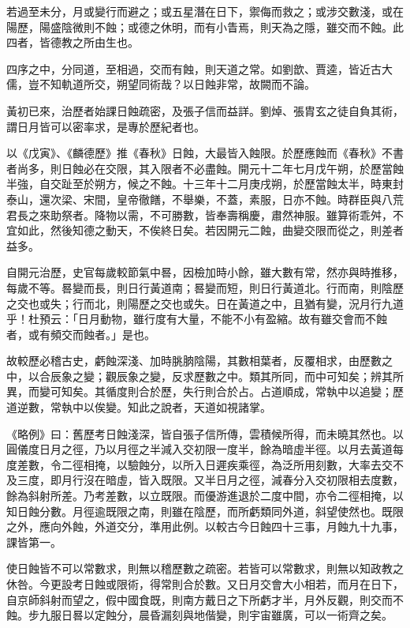 \begin{pinyinscope}
 若過至未分，月或變行而避之；或五星潛在日下，禦侮而救之；或涉交數淺，或在陽歷，陽盛陰微則不蝕；或德之休明，而有小眚焉，則天為之隱，雖交而不蝕。此四者，皆德教之所由生也。



 四序之中，分同道，至相過，交而有蝕，則天道之常。如劉歆、賈逵，皆近古大儒，豈不知軌道所交，朔望同術哉？以日蝕非常，故闕而不論。



 黃初已來，治歷者始課日蝕疏密，及張子信而益詳。劉焯、張胄玄之徒自負其術，謂日月皆可以密率求，是專於歷紀者也。



 以《戊寅》、《麟德歷》推《春秋》日蝕，大最皆入蝕限。於歷應蝕而《春秋》不書者尚多，則日蝕必在交限，其入限者不必盡蝕。開元十二年七月戊午朔，於歷當蝕半強，自交趾至於朔方，候之不蝕。十三年十二月庚戌朔，於歷當蝕太半，時東封泰山，還次梁、宋間，皇帝徹饍，不舉樂，不蓋，素服，日亦不蝕。時群臣與八荒君長之來助祭者。降物以需，不可勝數，皆奉壽稱慶，肅然神服。雖算術乖舛，不宜如此，然後知德之動天，不俟終日矣。若因開元二蝕，曲變交限而從之，則差者益多。



 自開元治歷，史官每歲較節氣中晷，因檢加時小餘，雖大數有常，然亦與時推移，每歲不等。晷變而長，則日行黃道南；晷變而短，則日行黃道北。行而南，則陰歷之交也或失；行而北，則陽歷之交也或失。日在黃道之中，且猶有變，況月行九道乎！杜預云：「日月動物，雖行度有大量，不能不小有盈縮。故有雖交會而不蝕者，或有頻交而蝕者。」是也。



 故較歷必稽古史，虧蝕深淺、加時朓朒陰陽，其數相葉者，反覆相求，由歷數之中，以合辰象之變；觀辰象之變，反求歷數之中。類其所同，而中可知矣；辨其所異，而變可知矣。其循度則合於歷，失行則合於占。占道順成，常執中以追變；歷道逆數，常執中以俟變。知此之說者，天道如視諸掌。



 《略例》曰：舊歷考日蝕淺深，皆自張子信所傳，雲積候所得，而未曉其然也。以圓儀度日月之徑，乃以月徑之半減入交初限一度半，餘為暗虛半徑。以月去黃道每度差數，令二徑相掩，以驗蝕分，以所入日遲疾乘徑，為泛所用刻數，大率去交不及三度，即月行沒在暗虛，皆入既限。又半日月之徑，減春分入交初限相去度數，餘為斜射所差。乃考差數，以立既限。而優游進退於二度中間，亦令二徑相掩，以知日蝕分數。月徑逾既限之南，則雖在陰歷，而所虧類同外道，斜望使然也。既限之外，應向外蝕，外道交分，準用此例。以較古今日蝕四十三事，月蝕九十九事，課皆第一。



 使日蝕皆不可以常數求，則無以稽歷數之疏密。若皆可以常數求，則無以知政教之休咎。今更設考日蝕或限術，得常則合於數。又日月交會大小相若，而月在日下，自京師斜射而望之，假中國食既，則南方戴日之下所虧才半，月外反觀，則交而不蝕。步九服日晷以定蝕分，晨昏漏刻與地偕變，則宇宙雖廣，可以一術齊之矣。




\end{pinyinscope}

